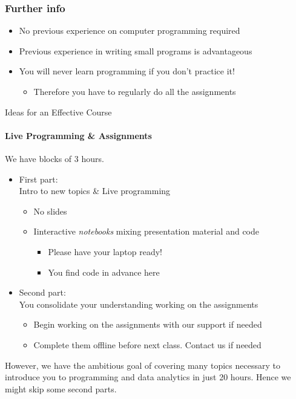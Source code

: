 \documentclass{beamer}%
\begin{document}
\begin{frame}
\frametitle{Further info}
\begin{itemize}
\item No previous experience on computer programming required
\item Previous experience in writing small programs is advantageous
\pause
\item You will never learn  programming if you don't practice it!
\begin{itemize}
\item \color{red}Therefore you have to regularly do all the assignments
\end{itemize}
\end{itemize}
\end{frame}


\begin{frame}{Ideas for an Effective Course} 
\framesubtitle{Live Programming \& Assignments}
We have blocks of 3 hours.
\begin{itemize}
\item First part: %
\\ Intro to new topics \& Live programming
    \begin{itemize}
    \item No slides
    \item Iinteractive \emph{notebooks} mixing presentation material and code %
      \begin{itemize}
      \item Please have your laptop ready! \myurl{\homepagesetup}
	  \item You find code in advance here %
      \end{itemize}
    \end{itemize}


\item Second part: %
\\ You consolidate your understanding working on the assignments
\begin{itemize}
\item Begin working on the assignments with our support if needed
\item Complete them offline before next class. Contact us if needed
\end{itemize}
\end{itemize}
\pause
{\color{red}
However, we have the ambitious goal of covering many topics necessary to introduce you to programming and data analytics in just 20 hours. Hence we might skip some second parts.
}
\end{frame}
\end{document}

